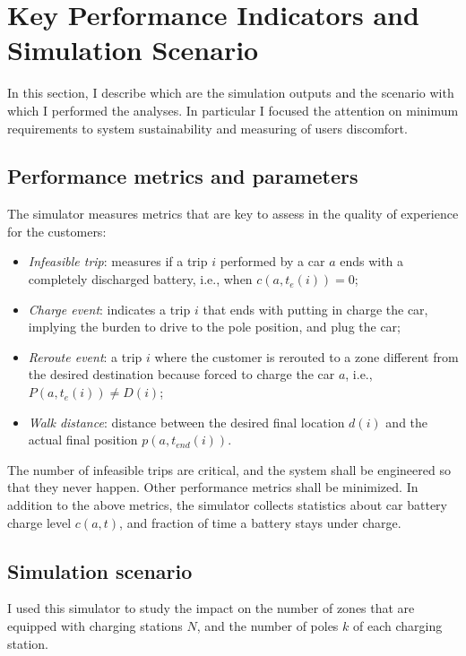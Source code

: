 \section{Key Performance Indicators and Simulation Scenario}
\label{sec:5_5_kpi_scenario}
In this section, I describe which are the simulation outputs and the scenario with which I performed the analyses. In particular I focused the attention on minimum requirements to system sustainability and measuring of users discomfort. 

\subsection{Performance metrics and parameters}

The simulator measures metrics that are  key to assess in the quality of experience for the customers:
\begin{itemize}
	\item \emph{Infeasible trip}: measures if a trip $i$ performed by a car $a$ ends with a completely discharged battery, i.e., when $c(a,t_{e}(i))= 0$;
	\item \emph{Charge event}: indicates a trip $i$ that ends with putting in charge the car, implying the burden to drive to the pole position, and plug the car;
	\item \emph{Reroute event}: a trip $i$ where the customer is rerouted to a zone different from the  desired destination because forced to charge the car $a$, i.e., $P(a,t_{e}(i))\neq D(i)$;
	\item \emph{Walk distance}: distance between the desired final location $d(i)$ and the actual final position $p(a,t_{end}(i))$.
\end{itemize}

The number of infeasible trips are critical, and the system shall be engineered so that they never happen. Other performance metrics shall be minimized. 
In addition to the above metrics, the simulator collects statistics about car battery charge level $c(a,t)$, and fraction of time a battery stays under charge.

\subsection{Simulation scenario}

I used this simulator to study the impact on the number of zones that are equipped with charging stations $N$, and the number of poles $k$ of each charging station.

